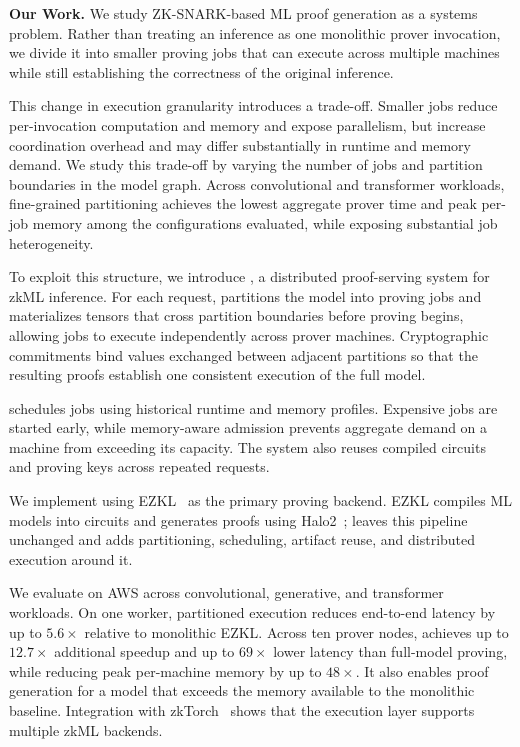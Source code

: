 \noindent\textbf{Our Work.}
We study ZK-SNARK-based ML proof generation as a systems problem. Rather than treating an inference as one monolithic prover invocation, we divide it into smaller proving jobs that can execute across multiple machines while still establishing the correctness of the original inference.

This change in execution granularity introduces a trade-off. Smaller jobs reduce per-invocation computation and memory and expose parallelism, but increase coordination overhead and may differ substantially in runtime and memory demand. We study this trade-off by varying the number of jobs and partition boundaries in the model graph. Across convolutional and transformer workloads, fine-grained partitioning achieves the lowest aggregate prover time and peak per-job memory among the configurations evaluated, while exposing substantial job heterogeneity.

To exploit this structure, we introduce \TITLE{}, a distributed proof-serving system for zkML inference. For each request, \TITLE{} partitions the model into proving jobs and materializes tensors that cross partition boundaries before proving begins, allowing jobs to execute independently across prover machines. Cryptographic commitments bind values exchanged between adjacent partitions so that the resulting proofs establish one consistent execution of the full model.

\TITLE{} schedules jobs using historical runtime and memory profiles. Expensive jobs are started early, while memory-aware admission prevents aggregate demand on a machine from exceeding its capacity. The system also reuses compiled circuits and proving keys across repeated requests.

We implement \TITLE{} using EZKL~\cite{ezkl} as the primary proving backend. EZKL compiles ML models into circuits and generates proofs using Halo2~\cite{halo2}; \TITLE{} leaves this pipeline unchanged and adds partitioning, scheduling, artifact reuse, and distributed execution around it.

We evaluate \TITLE{} on AWS across convolutional, generative, and transformer workloads. On one worker, partitioned execution reduces end-to-end latency by up to \(5.6\times\) relative to monolithic EZKL. Across ten prover nodes, \TITLE{} achieves up to \(12.7\times\) additional speedup and up to \(69\times\) lower latency than full-model proving, while reducing peak per-machine memory by up to \(48\times\). It also enables proof generation for a model that exceeds the memory available to the monolithic baseline. Integration with zkTorch~\cite{chen2025zktorch} shows that the execution layer supports multiple zkML backends.

